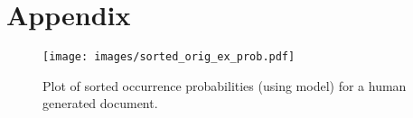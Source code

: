 \section{Appendix}

\begin{figure}
  \centering
  \texttt{[image: images/sorted\_orig\_ex\_prob.pdf]}
  \caption{Plot of sorted occurrence probabilities (using \bertsmall model) for a human generated document.}\label{sorted_probs_plot}
\end{figure}


